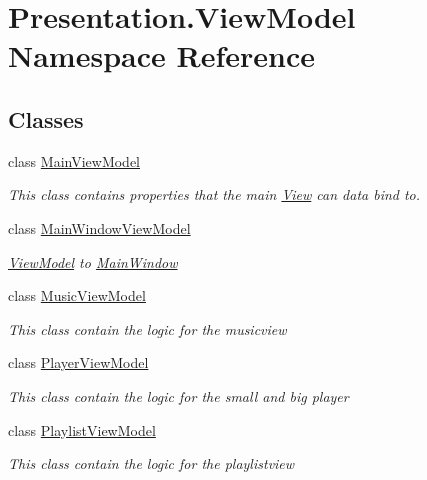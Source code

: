 \hypertarget{namespace_presentation_1_1_view_model}{}\section{Presentation.\+View\+Model Namespace Reference}
\label{namespace_presentation_1_1_view_model}
\subsection*{Classes}
\begin{DoxyCompactItemize}
\item 
class \hyperlink{class_presentation_1_1_view_model_1_1_main_view_model}{Main\+View\+Model}
\begin{DoxyCompactList}\small\item\em This class contains properties that the main \hyperlink{namespace_presentation_1_1_view}{View} can data bind to. \end{DoxyCompactList}\item 
class \hyperlink{class_presentation_1_1_view_model_1_1_main_window_view_model}{Main\+Window\+View\+Model}
\begin{DoxyCompactList}\small\item\em \hyperlink{namespace_presentation_1_1_view_model}{View\+Model} to \hyperlink{class_presentation_1_1_main_window}{Main\+Window} \end{DoxyCompactList}\item 
class \hyperlink{class_presentation_1_1_view_model_1_1_music_view_model}{Music\+View\+Model}
\begin{DoxyCompactList}\small\item\em This class contain the logic for the musicview \end{DoxyCompactList}\item 
class \hyperlink{class_presentation_1_1_view_model_1_1_player_view_model}{Player\+View\+Model}
\begin{DoxyCompactList}\small\item\em This class contain the logic for the small and big player \end{DoxyCompactList}\item 
class \hyperlink{class_presentation_1_1_view_model_1_1_playlist_view_model}{Playlist\+View\+Model}
\begin{DoxyCompactList}\small\item\em This class contain the logic for the playlistview \end{DoxyCompactList}\item 

\end{DoxyCompactItemize}
